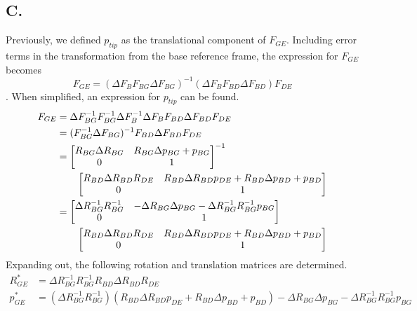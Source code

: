 \documentclass[letterpaper, 11pt]{article}
\begin{document}
\subsection*{C.}
Previously, we defined $p_{tip}$ as the translational component of $F_{GE}$. Including error terms in the transformation from the base reference frame, the expression for $F_{GE}$ becomes $$F_{GE} = (\Delta F_{B}F_{BG}\Delta F_{BG})^{-1}(\Delta F_{B}F_{BD}\Delta F_{BD})F_{DE}$$.
When simplified, an expression for $p_{tip}$ can be found.
\begin{align}
    F_{GE} &= \Delta F_{BG}^{-1}F_{BG}^{-1}\Delta F_{B}^{-1}\Delta F_{B}F_{BD}\Delta F_{BD}F_{DE}\\
    &= (F_{BG}^{-1}\Delta F_{BG})^{-1}F_{BD}\Delta F_{BD}F_{DE}\\  \notag
    &= \begin{bmatrix}
        R_{BG}\Delta R_{BG} & R_{BG}\Delta p_{BG} + p_{BG} \\
        0 & 1 \\
    \end{bmatrix}^{-1} \\
    & \qquad \begin{bmatrix}
        R_{BD}\Delta R_{BD}R_{DE} & R_{BD}\Delta R_{BD}p_{DE} + R_{BD}\Delta p_{BD} + p_{BD} \\
        0 & 1 \\
    \end{bmatrix}\\ \notag
    &= \begin{bmatrix}
        \Delta R_{BG}^{-1}R_{BG}^{-1} & -\Delta R_{BG}\Delta p_{BG} - \Delta R_{BG}^{-1}R_{BG}^{-1}p_{BG} \\
        0 & 1 \\
    \end{bmatrix} \\
    & \qquad \begin{bmatrix}
        R_{BD}\Delta R_{BD}R_{DE} & R_{BD}\Delta R_{BD}p_{DE} + R_{BD}\Delta p_{BD} + p_{BD} \\
        0 & 1 \\
    \end{bmatrix}
\end{align}
Expanding out, the following rotation and translation matrices are determined.
\begin{align}
R_{GE}^* &= \Delta R_{BG}^{-1}R_{BG}^{-1}R_{BD}\Delta R_{BD}R_{DE} \\
p_{GE}^* &= (\Delta R_{BG}^{-1}R_{BG}^{-1})(R_{BD}\Delta R_{BD}p_{DE} + R_{BD}\Delta p_{BD} + p_{BD}) -\Delta R_{BG}\Delta p_{BG} - \Delta R_{BG}^{-1}R_{BG}^{-1}p_{BG}
\end{align}
\end{document}
